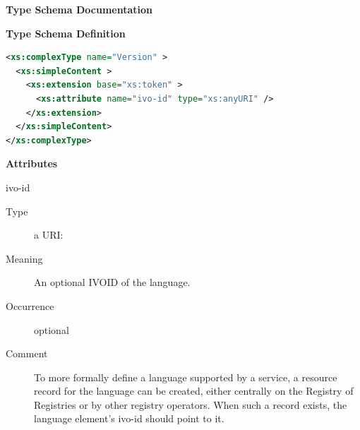 \documentclass{ivoa}
\begin{document}
\endgroup

\begingroup
      	\renewcommand*\descriptionlabel[1]{%
      	\hbox to 5.5em{\emph{#1}\hfil}}
      	\vspace{2ex}\noindent\textbf{ Type Schema Documentation}



\vspace{1ex}\noindent\textbf{ Type Schema Definition}

\begin{lstlisting}[language=XML,basicstyle=\footnotesize]
<xs:complexType name="Version" >
  <xs:simpleContent >
    <xs:extension base="xs:token" >
      <xs:attribute name="ivo-id" type="xs:anyURI" />
    </xs:extension>
  </xs:simpleContent>
</xs:complexType>
\end{lstlisting}

\vspace{0.5ex}\noindent\textbf{ Attributes}

\begingroup\small\begin{bigdescription}
\item[ivo-id]
\begin{description}
\item[Type] a URI: 
\item[Meaning] 
    				An optional IVOID of the language.
    				
\item[Occurrence] optional
\item[Comment] 
    					To more formally define a language supported by a service,
    					a resource record for the language can be created, either
    					centrally on the Registry of Registries or by other registry operators.  
    					When such a record exists, the language element's ivo-id
    					should point to it.
    				
\end{description}


\end{bigdescription}\endgroup
\end{document}
